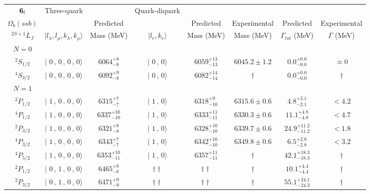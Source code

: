 \begin{tabular}{c| c c c c c c c}\hline \hline
${\bf {6}}_{\rm f}$  & Three-quark & & Quark-diquark   &             &      &        &  \\ 
$\Omega_{b}(ssb)$ &   & Predicted  &   &  Predicted   &  Experimental &  Predicted            & Experimental \\ 
 $^{2S+1}L_{J}$ & $\vert l_{\lambda}, l_{\rho}, k_{\lambda}, k_{\rho} \rangle$ & Mass (MeV)  & $\vert l_{r}, k_{r} \rangle$  &  Mass (MeV)   &  Mass (MeV)   &  $\Gamma_{tot}$ (MeV) & $\Gamma$ (MeV) \\ \hline
\hline
 $N=0$  &  &  &  &  &  \\ 
$^{2}S_{1/2}$ & $\vert \,\,0\,,\,0\,,\,0\,,\,0 \rangle $ & $6064^{+8}_{-8}$ & $\vert \,\,0\,,\,0 \rangle$ & $6059^{+13}_{-13}$ & $6045.2\pm 1.2$ & $0.0^{+0.0}_{-0.0}$ & $\approx 0$ \\ 
$^{4}S_{3/2}$ & $\vert \,\,0\,,\,0\,,\,0\,,\,0 \rangle $ & $6092^{+9}_{-8}$ & $\vert \,\,0\,,\,0 \rangle$ & $6082^{+14}_{-14}$ & $\dagger$ & $0.0^{+0.0}_{-0.0}$ & $\dagger$ \\ 
\hline
 $N=1$  &  &  &  &  &  \\ 
$^{2}P_{1/2}$ & $\vert \,\,1\,,\,0\,,\,0\,,\,0 \rangle $ & $6315^{+7}_{-7}$ & $\vert \,\,1\,,\,0 \rangle$ & $6318^{+9}_{-10}$ & $6315.6\pm 0.6$ & $4.8^{+2.1}_{-2.1}$ & $<4.2$ \\ 
$^{4}P_{1/2}$ & $\vert \,\,1\,,\,0\,,\,0\,,\,0 \rangle $ & $6337^{+10}_{-10}$ & $\vert \,\,1\,,\,0 \rangle$ & $6333^{+11}_{-11}$ & $6330.3\pm 0.6$ & $11.1^{+4.8}_{-4.8}$ & $<4.7$ \\ 
$^{2}P_{3/2}$ & $\vert \,\,1\,,\,0\,,\,0\,,\,0 \rangle $ & $6321^{+8}_{-8}$ & $\vert \,\,1\,,\,0 \rangle$ & $6328^{+10}_{-10}$ & $6339.7\pm 0.6$ & $24.9^{+11.2}_{-11.2}$ & $<1.8$ \\ 
$^{4}P_{3/2}$ & $\vert \,\,1\,,\,0\,,\,0\,,\,0 \rangle $ & $6343^{+7}_{-7}$ & $\vert \,\,1\,,\,0 \rangle$ & $6342^{+10}_{-10}$ & $6349.8\pm 0.6$ & $6.5^{+2.8}_{-2.8}$ & $<3.2$ \\ 
$^{4}P_{5/2}$ & $\vert \,\,1\,,\,0\,,\,0\,,\,0 \rangle $ & $6353^{+10}_{-11}$ & $\vert \,\,1\,,\,0 \rangle$ & $6357^{+11}_{-11}$ & $\dagger$ & $42.1^{+18.3}_{-18.3}$ & $\dagger$ \\ 
$^{2}P_{1/2}$ & $\vert \,\,0\,,\,1\,,\,0\,,\,0 \rangle $ & $6465^{+8}_{-8}$ & $\dagger\dagger$ & $\dagger\dagger$ & $\dagger$ & $10.1^{+4.4}_{-4.4}$ & $\dagger$ \\ 
$^{2}P_{3/2}$ & $\vert \,\,0\,,\,1\,,\,0\,,\,0 \rangle $ & $6471^{+9}_{-9}$ & $\dagger\dagger$ & $\dagger\dagger$ & $\dagger$ & $55.1^{+24.1}_{-24.3}$ & $\dagger$ \\ 

\end{tabular}
